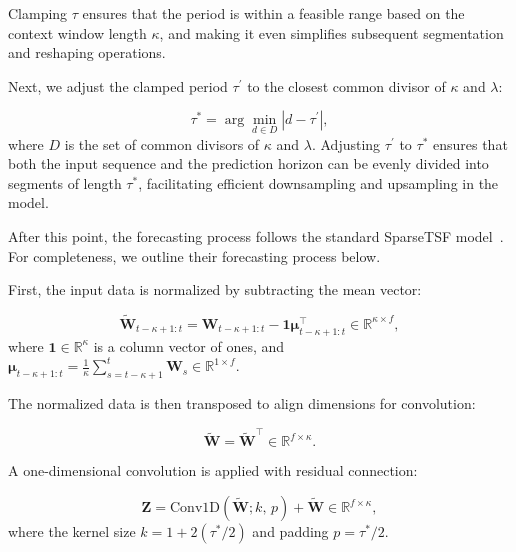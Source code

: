 Clamping $\tau$ ensures that the period is within a feasible range based on the context window length $\kappa$, and making it even simplifies subsequent segmentation and reshaping operations.

Next, we adjust the clamped period $\tau^\prime$ to the closest common divisor of $\kappa$ and $\lambda$:

\begin{equation}
\label{eq:tau_adjust}
\tau^{\ast} = \arg\min_{d \in D} \left| d - \tau^\prime \right|,
\end{equation}
where $D$ is the set of common divisors of $\kappa$ and $\lambda$. Adjusting $\tau^\prime$ to $\tau^{\ast}$ ensures that both the input sequence and the prediction horizon can be evenly divided into segments of length $\tau^{\ast}$, facilitating efficient downsampling and upsampling in the model.

After this point, the forecasting process follows the standard \ac{SparseTSF} model~\cite{sparseTSF}. For completeness, we outline their forecasting process below.

First, the input data is normalized by subtracting the mean vector:

\begin{equation}
\label{eq:normalization}
\tilde{\mathbf{W}}_{t-\kappa+1:t} = \mathbf{W}_{t-\kappa+1:t} - \mathbf{1} \boldsymbol{\mu}_{t-\kappa+1:t}^\top \in \mathbb{R}^{\kappa \times f},
\end{equation}
where $\mathbf{1} \in \mathbb{R}^{\kappa}$ is a column vector of ones, and $\boldsymbol{\mu}_{t-\kappa+1:t} = \frac{1}{\kappa} \sum_{s=t-\kappa+1}^{t} \mathbf{W}_{s} \in \mathbb{R}^{1 \times f}$.

The normalized data is then transposed to align dimensions for convolution:

\begin{equation}
\label{eq:permutation}
\tilde{\mathbf{W}} = \tilde{\mathbf{W}}^\top \in \mathbb{R}^{f \times \kappa}.
\end{equation}

A one-dimensional convolution is applied with residual connection:

\begin{equation}
\label{eq:convolution}
\mathbf{Z} = \text{Conv1D}\left( \tilde{\mathbf{W}}; k,\, p \right) + \tilde{\mathbf{W}} \in \mathbb{R}^{f \times \kappa},
\end{equation}
where the kernel size $k = 1 + 2(\tau^{\ast}/2)$ and padding $p = \tau^{\ast}/2$.

